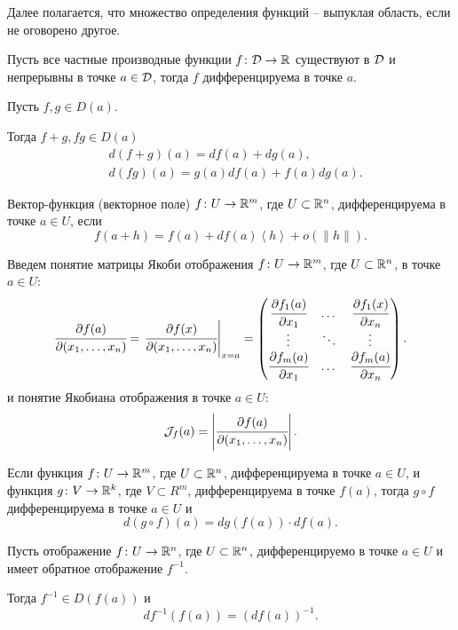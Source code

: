	\begin{remark}
		Далее полагается, что множество определения функций -- выпуклая область, если не оговорено другое.
	\end{remark}

	\begin{theorem}
		Пусть все частные производные функции $f\colon \mathcal{D} \to \mathbb{R}$ существуют в $\mathcal{D}$ и непрерывны в точке $a\in\mathcal{D}$, тогда $f$ дифференцируема в точке $a$.
	\end{theorem}

	\begin{theorem}
		Пусть $f, g \in D(a)$. 
		
		Тогда $f+g, fg \in D(a)$ 
		\begin{align*}
			&d(f+g)(a) = df(a)+dg(a),\\
			&d(fg)(a)=g(a)df(a)+f(a)dg(a).
		\end{align*}
	\end{theorem}
	
	\begin{mdef}
		Вектор-функция (векторное поле) $f\colon U \to \mathbb{R}^m$, где $U \subset \mathbb{R}^n$, дифференцируема в точке $a\in U$, если 	
		$$
			f(a+h)=f(a)+df(a)\left< h\right> +o(\|h\|).
		$$
	\end{mdef}

	\begin{mdef}
		Введем понятие матрицы Якоби отображения $f\colon U \to \mathbb{R}^m$, где $U \subset \mathbb{R}^n$, в точке $a\in U$:
		$$
			\cfrac {\partial f(a)} {\partial(x_1, \ldots, x_n)} = \left. \cfrac {\partial f(x)} {\partial(x_1, \ldots, x_n)} \right|_{x=a} = \begin{pmatrix}
				\cfrac {\partial f_1(a)} {\partial x_1} & \dots & \cfrac {\partial f_1(x)} {\partial x_n} \\
				\vdots & \ddots & \vdots \\
				\cfrac {\partial f_m(a)} {\partial x _1} & \dots & \cfrac {\partial f_m(a)} {\partial x_n}
			\end{pmatrix}.
		$$
		и понятие Якобиана отображения в точке $a \in U$:
		$$
			\mathcal{J}_f(a) = \left|  \cfrac {\partial f(a)} {\partial(x_1, \ldots, x_n)}  \right|.
		$$
	\end{mdef}
	
	\begin{theorem}
		Если функция $f\colon U \to \mathbb{R}^m$, где $U \subset \mathbb{R}^n$, дифференцируема в точке $a\in U$, и функция $g \colon V \to \mathbb{R}^k$, где $V \subset R^m$, дифференцируема в точке $f(a)$, тогда
		$g \circ f$ дифференцируема в точке $a \in U$ и 
		$$
			d(g \circ f)(a) = dg(f(a))\cdot df(a).
		$$
	\end{theorem}
	\begin{corollary}
		Пусть отображение $f\colon U \to \mathbb{R}^n$, где $U \subset \mathbb{R}^n$, дифференцируемо в точке $a\in U$ и  имеет обратное отображение $f^{-1}$.
		
		Тогда $f^{-1} \in D(f(a))$ и 
		$$
			df^{-1}(f(a)) = (df(a))^{-1}.
		$$
	\end{corollary}
	
